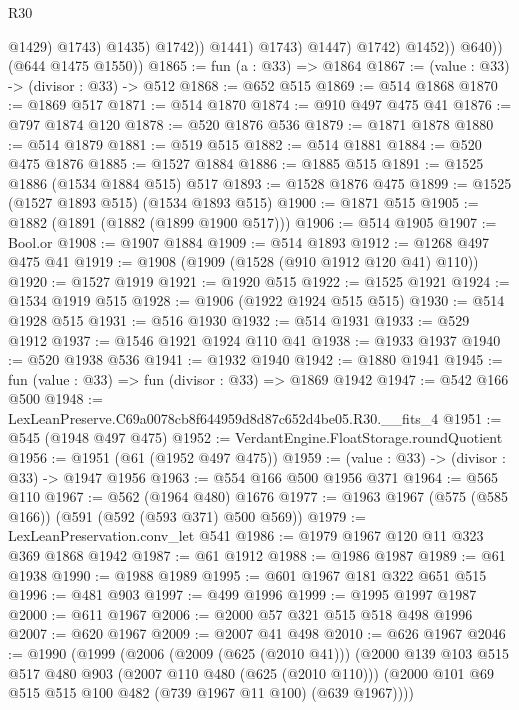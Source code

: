 \begin{lexlean}{R30}
\begin{coremodule}
                                @1429)
                              @1743)
                            @1435)
                          @1742))
                      @1441)
                    @1743)
                  @1447)
                @1742)
              @1452))
          @640))
      (@644 @1475 @1550))
@1865 := fun (a : @33) => @1864
@1867 := (value : @33) -> (divisor : @33) -> @512
@1868 := @652 @515
@1869 := @514 @1868
@1870 := @1869 @517
@1871 := @514 @1870
@1874 := @910 @497 @475 @41
@1876 := @797 @1874 @120
@1878 := @520 @1876 @536
@1879 := @1871 @1878
@1880 := @514 @1879
@1881 := @519 @515
@1882 := @514 @1881
@1884 := @520 @475 @1876
@1885 := @1527 @1884
@1886 := @1885 @515
@1891 := @1525 @1886 (@1534 @1884 @515) @517
@1893 := @1528 @1876 @475
@1899 := @1525 (@1527 @1893 @515) (@1534 @1893 @515)
@1900 := @1871 @515
@1905 := @1882 (@1891 (@1882 (@1899 @1900 @517)))
@1906 := @514 @1905
@1907 := Bool.or
@1908 := @1907 @1884
@1909 := @514 @1893
@1912 := @1268 @497 @475 @41
@1919 := @1908 (@1909 (@1528 (@910 @1912 @120 @41) @110))
@1920 := @1527 @1919
@1921 := @1920 @515
@1922 := @1525 @1921
@1924 := @1534 @1919 @515
@1928 := @1906 (@1922 @1924 @515 @515)
@1930 := @514 @1928 @515
@1931 := @516 @1930
@1932 := @514 @1931
@1933 := @529 @1912
@1937 := @1546 @1921 @1924 @110 @41
@1938 := @1933 @1937
@1940 := @520 @1938 @536
@1941 := @1932 @1940
@1942 := @1880 @1941
@1945 := fun (value : @33) => fun (divisor : @33) => @1869 @1942
@1947 := @542 @166 @500
@1948 := LexLeanPreserve.C69a0078cb8f644959d8d87c652d4be05.R30.__fits_4
@1951 := @545 (@1948 @497 @475)
@1952 := VerdantEngine.FloatStorage.roundQuotient
@1956 := @1951 (@61 (@1952 @497 @475))
@1959 := (value : @33) -> (divisor : @33) -> @1947 @1956
@1963 := @554 @166 @500 @1956 @371
@1964 := @565 @110
@1967 := @562 (@1964 @480) @1676
@1977 := @1963 @1967 (@575 (@585 @166)) (@591 (@592 (@593 @371) @500 @569))
@1979 := LexLeanPreservation.conv_let @541
@1986 := @1979 @1967 @120 @11 @323 @369 @1868 @1942
@1987 := @61 @1912
@1988 := @1986 @1987
@1989 := @61 @1938
@1990 := @1988 @1989
@1995 := @601 @1967 @181 @322 @651 @515
@1996 := @481 @903
@1997 := @499 @1996
@1999 := @1995 @1997 @1987
@2000 := @611 @1967
@2006 := @2000 @57 @321 @515 @518 @498 @1996
@2007 := @620 @1967
@2009 := @2007 @41 @498
@2010 := @626 @1967
@2046 := @1990
    (@1999
      (@2006
        (@2009 (@625 (@2010 @41)))
        (@2000
          @139
          @103
          @515
          @517
          @480
          @903
          (@2007 @110 @480 (@625 (@2010 @110)))
          (@2000 @101 @69 @515 @515 @100 @482 (@739 @1967 @11 @100) (@639 @1967))))

\end{coremodule}
\end{lexlean}
